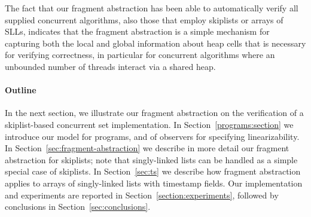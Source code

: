 The fact that our fragment abstraction has been able to automatically verify all
supplied concurrent algorithms, also those that employ skiplists or
arrays of SLLs, indicates that the fragment abstraction is a simple
mechanism for capturing both the local and global information about heap cells
that is necessary for verifying correctness, in particular for
concurrent algorithms where an unbounded number of threads interact
via a shared heap.

\paragraph{Outline}
In the next section, we illustrate our fragment abstraction on the
verification of a skiplist-based concurrent set implementation.
In Section~\ref{programs:section} we introduce our model for programs,
and of observers for specifying linearizability. In 
Section~\ref{sec:fragment-abstraction} we describe in more detail our
fragment abstraction for skiplists; note that singly-linked lists can
be handled as a simple special case of skiplists.
In Section~\ref{sec:ts} we describe how fragment abstraction applies to
arrays of singly-linked lists with timestamp fields.
Our implementation and
experiments are reported in Section~\ref{section:experiments}, followed
by conclusions in Section~\ref{sec:conclusions}.




